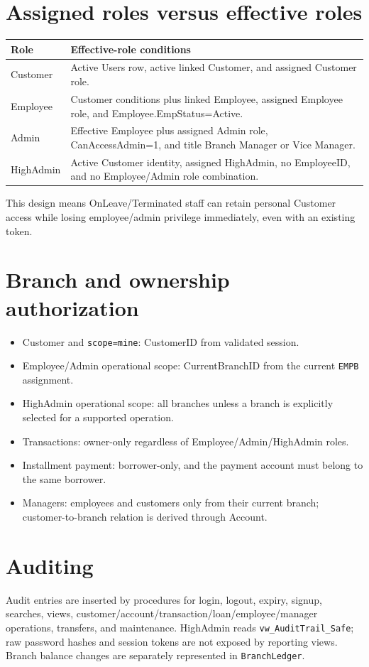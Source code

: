 \documentclass[11pt,a4paper,oneside]{report}
\begin{document}
\section{Assigned roles versus effective roles}
\begin{longtable}{L{0.18\textwidth}L{0.73\textwidth}}
\toprule\textbf{Role} & \textbf{Effective-role conditions}\\\midrule
Customer & Active Users row, active linked Customer, and assigned Customer role.\\
Employee & Customer conditions plus linked Employee, assigned Employee role, and Employee.EmpStatus=Active.\\
Admin & Effective Employee plus assigned Admin role, CanAccessAdmin=1, and title Branch Manager or Vice Manager.\\
HighAdmin & Active Customer identity, assigned HighAdmin, no EmployeeID, and no Employee/Admin role combination.\\
\bottomrule
\end{longtable}
This design means OnLeave/Terminated staff can retain personal Customer access while losing employee/admin privilege immediately, even with an existing token.

\section{Branch and ownership authorization}
\begin{itemize}
\item Customer and \texttt{scope=mine}: CustomerID from validated session.
\item Employee/Admin operational scope: CurrentBranchID from the current \texttt{EMPB} assignment.
\item HighAdmin operational scope: all branches unless a branch is explicitly selected for a supported operation.
\item Transactions: owner-only regardless of Employee/Admin/HighAdmin roles.
\item Installment payment: borrower-only, and the payment account must belong to the same borrower.
\item Managers: employees and customers only from their current branch; customer-to-branch relation is derived through Account.
\end{itemize}

\section{Auditing}
Audit entries are inserted by procedures for login, logout, expiry, signup, searches, views, customer/account/transaction/loan/employee/manager operations, transfers, and maintenance. HighAdmin reads \texttt{vw\_AuditTrail\_Safe}; raw password hashes and session tokens are not exposed by reporting views. Branch balance changes are separately represented in \texttt{BranchLedger}.
\end{document}

